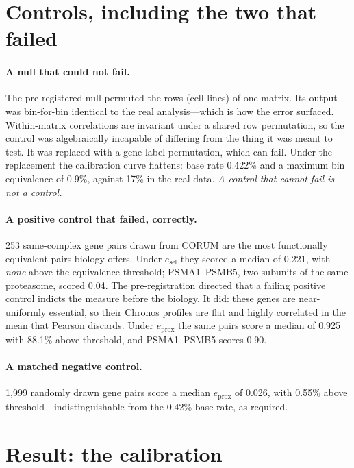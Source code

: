 \documentclass[11pt]{article}
\begin{document}
\section{Controls, including the two that failed}
\label{sec:controls}

\paragraph{A null that could not fail.} The pre-registered null permuted the
rows (cell lines) of one matrix. Its output was bin-for-bin identical to the
real analysis---which is how the error surfaced. Within-matrix correlations
are invariant under a shared row permutation, so the control was
algebraically incapable of differing from the thing it was meant to test. It
was replaced with a gene-label permutation, which can fail. Under the
replacement the calibration curve flattens: base rate 0.422\% and a maximum
bin equivalence of 0.9\%, against 17\% in the real data. \emph{A control that
cannot fail is not a control.}

\paragraph{A positive control that failed, correctly.} 253 same-complex gene
pairs drawn from CORUM are the most functionally equivalent pairs biology
offers. Under $e_{\mathrm{sel}}$ they scored a median of 0.221, with
\emph{none} above the equivalence threshold; PSMA1--PSMB5, two subunits of
the same proteasome, scored 0.04. The pre-registration directed that a
failing positive control indicts the measure before the biology. It did:
these genes are near-uniformly essential, so their Chronos profiles are flat
and highly correlated in the mean that Pearson discards. Under
$e_{\mathrm{prox}}$ the same pairs score a median of 0.925 with 88.1\% above
threshold, and PSMA1--PSMB5 scores 0.90.

\paragraph{A matched negative control.} 1,999 randomly drawn gene pairs
score a median $e_{\mathrm{prox}}$ of 0.026, with 0.55\% above
threshold---indistinguishable from the 0.42\% base rate, as required.

\section{Result: the calibration}
\end{document}
